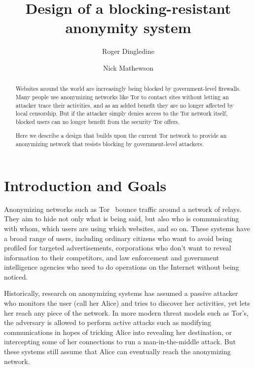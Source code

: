 \documentclass{llncs}
\begin{document}
\title{Design of a blocking-resistant anonymity system}

\author{Roger Dingledine \and Nick Mathewson}

\maketitle
\pagestyle{plain}

\begin{abstract}

Websites around the world are increasingly being blocked by
government-level firewalls. Many people use anonymizing networks like
Tor to contact sites without letting an attacker trace their activities,
and as an added benefit they are no longer affected by local censorship.
But if the attacker simply denies access to the Tor network itself,
blocked users can no longer benefit from the security Tor offers.

Here we describe a design that builds upon the current Tor network
to provide an anonymizing network that resists blocking
by government-level attackers.

\end{abstract}

\section{Introduction and Goals}

Anonymizing networks such as Tor~\cite{tor-design} bounce traffic around
a network of relays. They aim to hide not only what is being said, but
also who is communicating with whom, which users are using which websites,
and so on. These systems have a broad range of users, including ordinary
citizens who want to avoid being profiled for targeted advertisements,
corporations who don't want to reveal information to their competitors,
and law enforcement and government intelligence agencies who need to do
operations on the Internet without being noticed.

Historically, research on anonymizing systems has assumed a passive
attacker who monitors the user (call her Alice) and tries to discover her
activities, yet lets her reach any piece of the network. In more modern
threat models such as Tor's, the adversary is allowed to perform active
attacks such as modifying communications in hopes of tricking Alice
into revealing her destination, or intercepting some of her connections
to run a man-in-the-middle attack. But these systems still assume that
Alice can eventually reach the anonymizing network.
\end{document}
